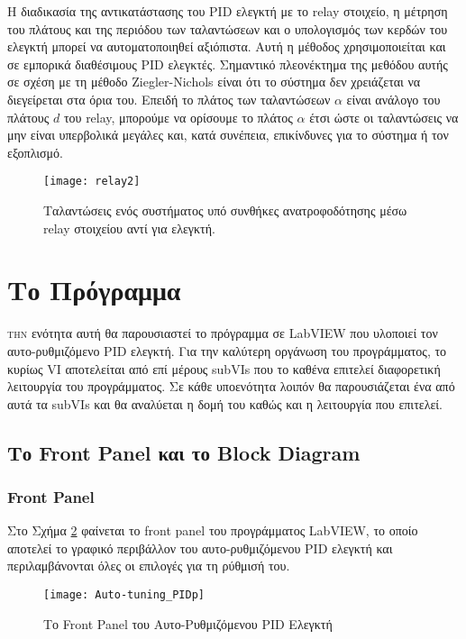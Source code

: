 Η διαδικασία της αντικατάστασης του PID ελεγκτή με το relay στοιχείο, η μέτρηση του πλάτους και της περιόδου των ταλαντώσεων και ο υπολογισμός των κερδών του ελεγκτή μπορεί να αυτοματοποιηθεί αξιόπιστα. Αυτή η μέθοδος χρησιμοποιείται και σε εμπορικά διαθέσιμους PID ελεγκτές. Σημαντικό πλεονέκτημα της μεθόδου αυτής σε σχέση με τη μέθοδο Ziegler-Nichols είναι ότι το σύστημα δεν χρειάζεται να διεγείρεται στα όρια του. Επειδή το πλάτος των ταλαντώσεων $\alpha$ είναι ανάλογο του πλάτους $d$ του relay, μπορούμε να ορίσουμε το πλάτος $\alpha$ έτσι ώστε οι ταλαντώσεις να μην είναι υπερβολικά μεγάλες και, κατά συνέπεια, επικίνδυνες για το σύστημα ή τον εξοπλισμό.

\begin{figure}[H]
  \centering
  \texttt{[image: relay2]}
  \caption{Ταλαντώσεις ενός συστήματος υπό συνθήκες ανατροφοδότησης μέσω relay στοιχείου αντί για ελεγκτή.}
  \label{fig:relay2}
\end{figure}

\section{Το Πρόγραμμα}

\lettrine[findent=2pt]{}{την} ενότητα αυτή θα παρουσιαστεί το πρόγραμμα σε LabVIEW που υλοποιεί τον αυτο-ρυθμιζόμενο PID ελεγκτή. Για την καλύτερη οργάνωση του προγράμματος, το κυρίως VI αποτελείται από επί μέρους subVIs που το καθένα επιτελεί διαφορετική λειτουργία του προγράμματος. Σε κάθε υποενότητα λοιπόν θα παρουσιάζεται ένα από αυτά τα subVIs και θα αναλύεται η δομή του καθώς και η λειτουργία που επιτελεί.

\subsection{Το Front Panel και το Block Diagram}

\subsubsection{Front Panel}

Στο Σχήμα \ref{fig:Auto-tuning_PIDp} φαίνεται το front panel του προγράμματος LabVIEW, το οποίο αποτελεί το γραφικό περιβάλλον του αυτο-ρυθμιζόμενου PID ελεγκτή και περιλαμβάνονται όλες οι επιλογές για τη ρύθμισή του.  

\begin{figure}[h]
  \centering
  \texttt{[image: Auto-tuning\_PIDp]}
  \caption{Το Front Panel του Αυτο-Ρυθμιζόμενου PID Ελεγκτή}
  \label{fig:Auto-tuning_PIDp}
\end{figure}

